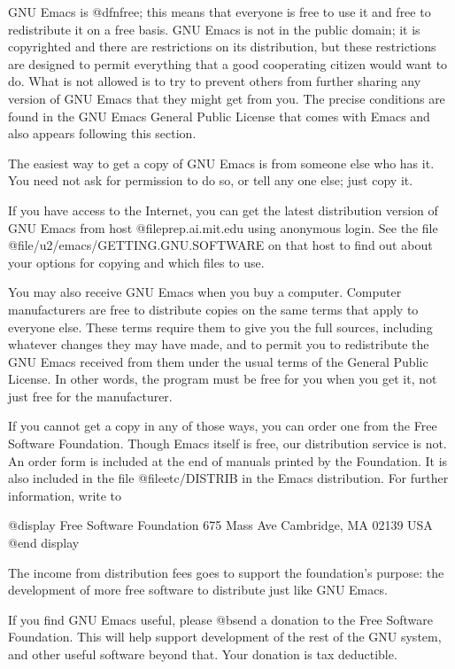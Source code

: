 GNU Emacs is @dfn{free}; this means that everyone is free to use it and
free to redistribute it on a free basis.  GNU Emacs is not in the public
domain; it is copyrighted and there are restrictions on its distribution,
but these restrictions are designed to permit everything that a good
cooperating citizen would want to do.  What is not allowed is to try to
prevent others from further sharing any version of GNU Emacs that they
might get from you.  The precise conditions are found in the GNU Emacs
General Public License that comes with Emacs and also appears following
this section.

The easiest way to get a copy of GNU Emacs is from someone else who has it.
You need not ask for permission to do so, or tell any one else; just copy
it.

If you have access to the Internet, you can get the latest distribution
version of GNU Emacs from host @file{prep.ai.mit.edu} using anonymous
login.  See the file @file{/u2/emacs/GETTING.GNU.SOFTWARE} on that host
to find out about your options for copying and which files to use.

You may also receive GNU Emacs when you buy a computer.  Computer
manufacturers are free to distribute copies on the same terms that apply to
everyone else.  These terms require them to give you the full sources,
including whatever changes they may have made, and to permit you to
redistribute the GNU Emacs received from them under the usual terms of the
General Public License.  In other words, the program must be free for you
when you get it, not just free for the manufacturer.

If you cannot get a copy in any of those ways, you can order one from the
Free Software Foundation.  Though Emacs itself is free, our distribution
service is not.  An order form is included at the end of manuals printed by
the Foundation.  It is also included in the file @file{etc/DISTRIB} in the
Emacs distribution.  For further information, write to

@display
Free Software Foundation
675 Mass Ave
Cambridge, MA 02139
USA
@end display

The income from distribution fees goes to support the foundation's
purpose: the development of more free software to distribute just like
GNU Emacs.

If you find GNU Emacs useful, please @b{send a donation} to the Free
Software Foundation.  This will help support development of the rest of the
GNU system, and other useful software beyond that.  Your donation is tax
deductible.

